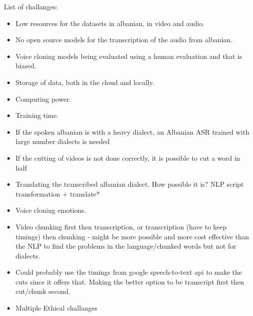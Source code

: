 \documentclass[12pt]{article}
\begin{document}
List of challanges:
\begin{itemize}
    \item Low resources for the datasets in albanian, in video and audio.
    \item No open source models for the transcription of the audio from albanian.
    \item Voice cloning models being evaluated using a human evaluation and that is biased.
    \item Storage of data, both in the cloud and locally.
    \item Computing power.
    \item Training time.
    \item If the spoken albanian is with a heavy dialect, an Albanian ASR trained with large number dialects is needed
    \item If the cutting of videos is not done correctly, it is possible to cut a word in half
    \item Translating the transcribed albanian dialect. How possible it is? NLP script transformation + translate*
    \item Voice cloning emotions.
    \item Video chunking first then transcription, or transcription (have to keep timings) then chunking - might be more possible and more cost effective than the NLP to find the problems in the language/chunked words but not for dialects.
    \item Could probably use the timings from google speech-to-text api to make the cuts since it offers that. Making the better option to be transcript first then cut/chunk second.  
    \item Multiple Ethical challanges
\end{itemize}
\end{document}
